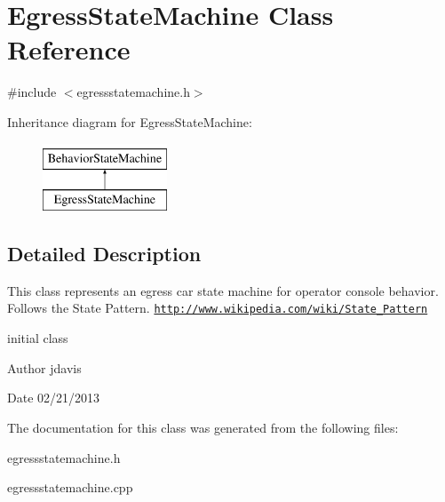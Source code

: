 \hypertarget{classEgressStateMachine}{\section{Egress\-State\-Machine Class Reference}
\label{classEgressStateMachine}
}


{\ttfamily \#include $<$egressstatemachine.\-h$>$}

Inheritance diagram for Egress\-State\-Machine\-:\begin{figure}[H]
\begin{center}
\leavevmode
\includegraphics[height=2.000000cm]{classEgressStateMachine}
\end{center}
\end{figure}


\subsection{Detailed Description}
This class represents an egress car state machine for operator console behavior. Follows the State Pattern. \href{http://www.wikipedia.com/wiki/State_Pattern}{\tt http\-://www.\-wikipedia.\-com/wiki/\-State\-\_\-\-Pattern}

initial class \begin{DoxyAuthor}{Author}
jdavis 
\end{DoxyAuthor}
\begin{DoxyDate}{Date}
02/21/2013 
\end{DoxyDate}


The documentation for this class was generated from the following files\-:\begin{DoxyCompactItemize}
\item 
egressstatemachine.\-h\item 
egressstatemachine.\-cpp\end{DoxyCompactItemize}
